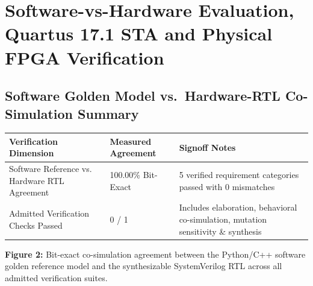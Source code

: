 \documentclass[11pt,a4paper]{article}
\begin{document}
\section{Software-vs-Hardware Evaluation, Quartus 17.1 STA and Physical FPGA Verification}

\subsection{Software Golden Model vs.\ Hardware-RTL Co-Simulation Summary}

{\small\renewcommand{\arraystretch}{1.18}\begin{longtable}{@{}L{0.38\textwidth}|L{0.22\textwidth}|L{0.32\textwidth}@{}}\toprule

\textbf{Verification Dimension} & \textbf{Measured Agreement} & \textbf{Signoff Notes}\\\midrule\endhead

Software Reference vs. Hardware RTL Agreement & 100.00\% Bit-Exact & 5 verified requirement categories passed with 0 mismatches\\[2pt]\hline

Admitted Verification Checks Passed & 0 /\allowbreak{} 1 & Includes elaboration,\allowbreak{} behavioral co-simulation,\allowbreak{} mutation sensitivity \& synthesis\\[2pt]\hline

\bottomrule\end{longtable}}

\begin{center}\begin{minipage}{\textwidth}\centering{}\par\vspace{3pt}

{\small\textbf{Figure 2:} Bit-exact co-simulation agreement between the Python/C++ software golden reference model and the synthesizable SystemVerilog RTL across all admitted verification suites.}\end{minipage}\end{center}
\end{document}
